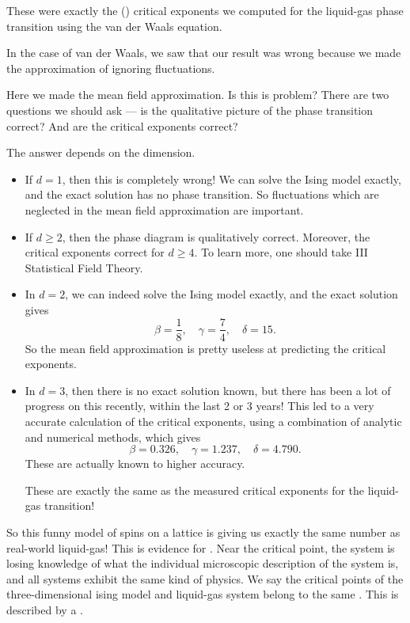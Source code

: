 \documentclass[a4paper]{article}
\begin{document}
These were exactly the () critical exponents we computed for the liquid-gas phase transition using the van der Waals equation.

In the case of van der Waals, we saw that our result was wrong because we made the approximation of ignoring fluctuations.

Here we made the mean field approximation. Is this is problem? There are two questions we should ask --- is the qualitative picture of the phase transition correct? And are the critical exponents correct?

The answer depends on the dimension.
\begin{itemize}
  \item If $d = 1$, then this is completely wrong! We can solve the Ising model exactly, and the exact solution has no phase transition. So fluctuations which are neglected in the mean field approximation are important.
  \item If $d \geq 2$, then the phase diagram is qualitatively correct. Moreover, the critical exponents correct for $d \geq 4$. To learn more, one should take III Statistical Field Theory.
  \item In $d = 2$, we can indeed solve the Ising model exactly, and the exact solution gives
    \[
      \beta = \frac{1}{8},\quad \gamma = \frac{7}{4},\quad \delta = 15.
    \]
    So the mean field approximation is pretty useless at predicting the critical exponents.
  \item In $d = 3$, then there is no exact solution known, but there has been a lot of progress on this recently, within the last 2 or 3 years! This led to a very accurate calculation of the critical exponents, using a combination of analytic and numerical methods, which gives
    \[
      \beta = 0.326,\quad \gamma = 1.237,\quad \delta = 4.790.
    \]
    These are actually known to higher accuracy.

    These are exactly the same as the measured critical exponents for the liquid-gas transition!
\end{itemize}
So this funny model of spins on a lattice is giving us exactly the same number as real-world liquid-gas! This is evidence for . Near the critical point, the system is losing knowledge of what the individual microscopic description of the system is, and all systems exhibit the same kind of physics. We say the critical points of the three-dimensional ising model and liquid-gas system belong to the same . This is described by a .
\end{document}
